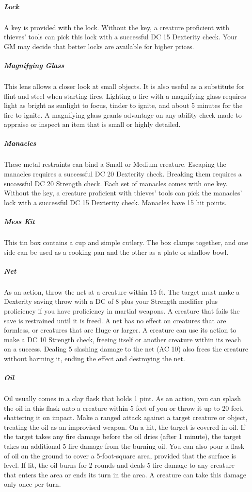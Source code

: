 \subparagraph*{Lock} A key is provided with the lock. Without the key, a creature proficient with thieves' tools can pick this lock with a successful DC 15 Dexterity check. Your GM may decide that better locks are available for higher prices.

\subparagraph*{Magnifying Glass} This lens allows a closer look at small objects. It is also useful as a substitute for flint and steel when starting fires. Lighting a fire with a magnifying glass requires light as bright as sunlight to focus, tinder to ignite, and about 5 minutes for the fire to ignite. A magnifying glass grants advantage on any ability check made to appraise or inspect an item that is small or highly detailed.

\subparagraph*{Manacles} These metal restraints can bind a Small or Medium creature. Escaping the manacles requires a successful DC 20 Dexterity check. Breaking them requires a successful DC 20 Strength check. Each set of manacles comes with one key. Without the key, a creature proficient with thieves' tools can pick the manacles' lock with a successful DC 15 Dexterity check. Manacles have 15 hit points.

\subparagraph*{Mess Kit} This tin box contains a cup and simple cutlery. The box clamps together, and one side can be used as a cooking pan and the other as a plate or shallow bowl.

\subparagraph*{Net} As an action, throw the net at a creature within 15 ft. The target must make a Dexterity saving throw with a DC of 8 plus your Strength modifier plus proficiency if you have proficiency in martial weapons. A creature that fails the save is restrained until it is freed. A net has no effect on creatures that are formless, or creatures that are Huge or larger. A creature can use its action to make a DC 10 Strength check, freeing itself or another creature within its reach on a success. Dealing 5 slashing damage to the net (AC 10) also frees the creature without harming it, ending the effect and destroying the net.

\subparagraph*{Oil} Oil usually comes in a clay flask that holds 1 pint. As an action, you can splash the oil in this flask onto a creature within 5 feet of you or throw it up to 20 feet, shattering it on impact. Make a ranged attack against a target creature or object, treating the oil as an improvised weapon. On a hit, the target is covered in oil. If the target takes any fire damage before the oil dries (after 1 minute), the target takes an additional 5 fire damage from the burning oil. You can also pour a flask of oil on the ground to cover a 5-foot-square area, provided that the surface is level. If lit, the oil burns for 2 rounds and deals 5 fire damage to any creature that enters the area or ends its turn in the area. A creature can take this damage only once per turn.

